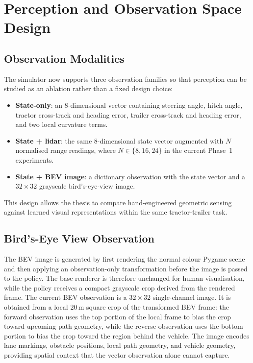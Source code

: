 \chapter{Perception and Observation Space Design}
\label{ch:perception}

\section{Observation Modalities}

The simulator now supports three observation families so that perception can be studied as an ablation rather than a fixed design choice:
\begin{itemize}
    \item \textbf{State-only}: an 8-dimensional vector containing steering angle, hitch angle, tractor cross-track and heading error, trailer cross-track and heading error, and two local curvature terms.
    \item \textbf{State + lidar}: the same 8-dimensional state vector augmented with $N$ normalised range readings, where $N \in \{8,16,24\}$ in the current Phase~1 experiments.
    \item \textbf{State + BEV image}: a dictionary observation with the state vector and a $32 \times 32$ grayscale bird's-eye-view image.
\end{itemize}

This design allows the thesis to compare hand-engineered geometric sensing against learned visual representations within the same tractor-trailer task.

\section{Bird's-Eye View Observation}

The BEV image is generated by first rendering the normal colour Pygame scene and then applying an observation-only transformation before the image is passed to the policy. The base renderer is therefore unchanged for human visualisation, while the policy receives a compact grayscale crop derived from the rendered frame. The current BEV observation is a $32 \times 32$ single-channel image. It is obtained from a local $20\,\mathrm{m}$ square crop of the transformed BEV frame: the forward observation uses the top portion of the local frame to bias the crop toward upcoming path geometry, while the reverse observation uses the bottom portion to bias the crop toward the region behind the vehicle. The image encodes lane markings, obstacle positions, local path geometry, and vehicle geometry, providing spatial context that the vector observation alone cannot capture.

